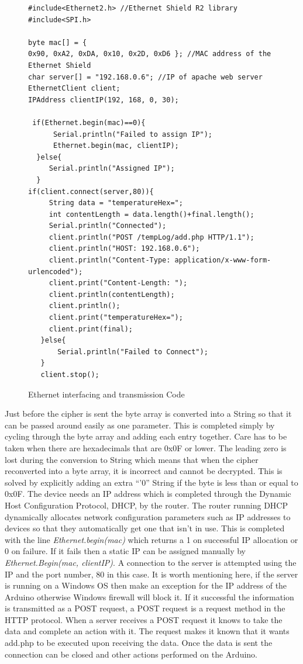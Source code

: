 \begin{figure}[H]
\begin{lstlisting}[style=Arduino]
#include<Ethernet2.h> //Ethernet Shield R2 library
#include<SPI.h>

byte mac[] = {
0x90, 0xA2, 0xDA, 0x10, 0x2D, 0xD6 }; //MAC address of the Ethernet Shield
char server[] = "192.168.0.6"; //IP of apache web server
EthernetClient client;
IPAddress clientIP(192, 168, 0, 30);

 if(Ethernet.begin(mac)==0){
      Serial.println("Failed to assign IP");
      Ethernet.begin(mac, clientIP);
  }else{
     Serial.println("Assigned IP");
  }
if(client.connect(server,80)){
     String data = "temperatureHex=";
     int contentLength = data.length()+final.length();
     Serial.println("Connected");   
     client.println("POST /tempLog/add.php HTTP/1.1"); 
     client.println("HOST: 192.168.0.6"); 
     client.println("Content-Type: application/x-www-form-urlencoded");
     client.print("Content-Length: ");
     client.println(contentLength);
     client.println();
     client.print("temperatureHex=");
     client.print(final);
   }else{
       Serial.println("Failed to Connect");
   }
   client.stop();
\end{lstlisting}
\caption{Ethernet interfacing and transmission Code }
\label{snip:ethernet}
\end{figure}

 Just before the cipher is sent the byte array is converted into a String so that it can be passed around easily as one parameter. This is completed simply by cycling through the byte array and adding each entry together. Care has to be taken when there are hexadecimals that are 0x0F or lower. The leading zero is lost during the conversion to String which means that when the cipher reconverted into a byte array, it is incorrect and cannot be decrypted. This is solved by explicitly adding an extra ``'0'' String if the byte is less than or equal to 0x0F.  The device needs an IP address which is completed through the Dynamic Host Configuration Protocol, DHCP, by the router. The router running DHCP dynamically allocates network configuration parameters such as IP addresses to devices so that they automatically get one that isn't in use. This is completed with the line \emph{Ethernet.begin(mac)} which returns a 1 on successful IP allocation or 0 on failure. If it fails then a static IP can be assigned manually by \emph{Ethernet.Begin(mac, clientIP)}. A connection to the server is attempted using the IP and the port number, 80 in this case. It is worth mentioning here, if the server is running on a Windows OS then make an exception for the IP address of the Arduino otherwise Windows firewall will block it. If it successful the information is transmitted as a POST request, a POST request is a request method in the HTTP protocol. When a server receives a POST request it knows to take the data and complete an action with it. The request makes it known that it wants add.php to be executed upon receiving the data. %
Once the data is sent the connection can be closed and other actions performed on the Arduino.
 
